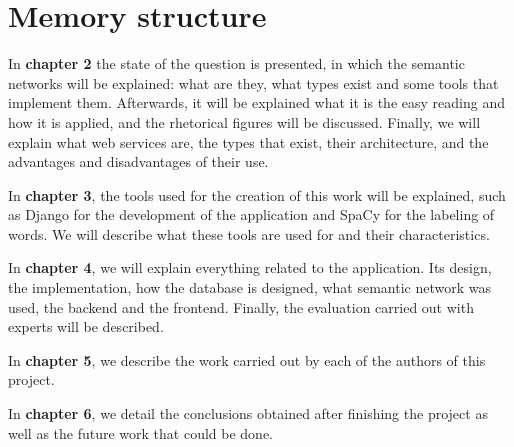 \section{Memory structure}
\label{sec:memory_structure}

In \textbf{chapter 2} the state of the question is presented, in which the semantic networks will be explained: what are they, what types exist and some tools that implement them. Afterwards, it will be explained what it is the easy reading and how it is applied, and the rhetorical figures will be discussed. Finally, we will explain what web services are, the types that exist, their architecture, and the advantages and disadvantages of their use.


In \textbf{chapter 3}, the tools used for the creation of this work will be explained, such as Django for the development of the application and SpaCy for the labeling of words. We will describe what these tools are used for and their characteristics.


In \textbf{chapter 4}, we will explain everything related to the application. Its design, the implementation, how the database is designed, what semantic network was used, the backend and the frontend. Finally, the evaluation carried out with experts will be described.


In \textbf{chapter 5}, we describe the work carried out by each of the authors of this project.


In \textbf{chapter 6}, we detail the conclusions obtained after finishing the project as well as the future work that could be done.












